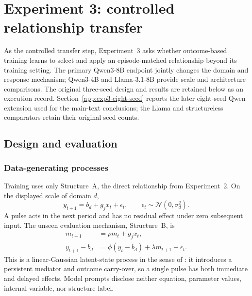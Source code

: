 

\section{Experiment 3: controlled relationship transfer}
\label{app:exp3}

As the controlled transfer step, Experiment~3 asks whether outcome-based training
learns to select and apply an episode-matched relationship beyond its training
setting. The primary Qwen3-8B endpoint jointly changes the domain and response
mechanism; Qwen3-4B and Llama-3.1-8B provide scale and architecture comparisons.
The original three-seed design and results are retained below as an execution
record. Section~\ref{app:exp3-eight-seed} reports the later eight-seed Qwen
extension used for the main-text conclusions; the Llama and structureless
comparators retain their original seed counts.

\subsection{Design and evaluation}
\label{app:exp3-coin-structural}

\subsubsection{Data-generating processes}

Training uses only Structure~A, the direct relationship from Experiment~2. On
the displayed scale of domain $d$,
\begin{equation}
  y_{t+1}=b_d+g_jx_t+\epsilon_t,\qquad
  \epsilon_t\sim\mathcal N(0,\sigma_d^2).
  \label{eq:exp3-coin-a}
\end{equation}
A pulse acts in the next period and has no residual effect under zero subsequent
input. The unseen evaluation mechanism, Structure~B, is
\begin{align}
  m_{t+1}&=\rho m_t+g_jx_t,\\
  y_{t+1}-b_d&=\phi(y_t-b_d)+\lambda m_{t+1}+\epsilon_t.
  \label{eq:exp3-coin-b}
\end{align}
This is a linear-Gaussian latent-state process in the sense of
\citet{kalman1960new}: it introduces a persistent mediator and outcome carry-over,
so a single pulse has both immediate and delayed effects. Model prompts disclose neither equation,
parameter values, internal variable, nor structure label.

